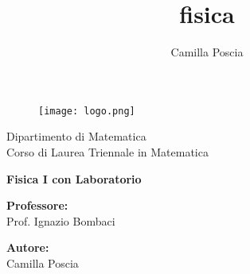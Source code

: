 \documentclass[italian,11pt,a4paper]{report}
\title{fisica}
\author{Camilla Poscia}
\begin{document}
\begin{titlepage} 
\begin{figure}
	\centering
	\texttt{[image: logo.png]}
	\label{fig:marchiounipipant541}
\end{figure}

	\vspace{20mm}
	
	\begin{Large}
		\begin{center}
			Dipartimento di Matematica\\ Corso di Laurea Triennale in Matematica\\
			\vspace{30mm}
		
			{\huge{\bf Fisica I con Laboratorio}}\\
		\end{center}
	\end{Large}
	
	\vspace{7,5 cm}

	\begin{minipage}[t]{0.47\textwidth}
		{\large{\bf Professore:}\\ \large{Prof. Ignazio Bombaci}}
	\end{minipage}
	\hfill
	\begin{minipage}[t]{0.47\textwidth}\raggedleft
		{\large{\bf Autore:}\\ \large{Camilla Poscia}}
	\end{minipage}
	
	\vspace{25mm}
	
	\hrulefill
	
	\vspace{5mm}
	
	
\end{titlepage}
\end{document}
